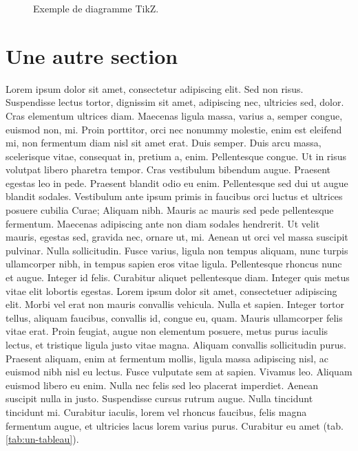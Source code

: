 \begin{figure}[htp]
  \centering
  
  \caption{Exemple de diagramme TikZ.}
  \label{fig:une-image}
\end{figure}

\section{Une autre section}
Lorem ipsum dolor sit amet, consectetur adipiscing elit. Sed non risus. Suspendisse lectus tortor, dignissim sit amet, adipiscing nec, ultricies sed, dolor. Cras elementum ultrices diam. Maecenas ligula massa, varius a, semper congue, euismod non, mi. Proin porttitor, orci nec nonummy molestie, enim est eleifend mi, non fermentum diam nisl sit amet erat. Duis semper. Duis arcu massa, scelerisque vitae, consequat in, pretium a, enim. Pellentesque congue. Ut in risus volutpat libero pharetra tempor. Cras vestibulum bibendum augue. Praesent egestas leo in pede. Praesent blandit odio eu enim. Pellentesque sed dui ut augue blandit sodales. Vestibulum ante ipsum primis in faucibus orci luctus et ultrices posuere cubilia Curae; Aliquam nibh. Mauris ac mauris sed pede pellentesque fermentum. Maecenas adipiscing ante non diam sodales hendrerit. Ut velit mauris, egestas sed, gravida nec, ornare ut, mi. Aenean ut orci vel massa suscipit pulvinar. Nulla sollicitudin. Fusce varius, ligula non tempus aliquam, nunc turpis ullamcorper nibh, in tempus sapien eros vitae ligula. Pellentesque rhoncus nunc et augue. Integer id felis. Curabitur aliquet pellentesque diam. Integer quis metus vitae elit lobortis egestas. Lorem ipsum dolor sit amet, consectetuer adipiscing elit. Morbi vel erat non mauris convallis vehicula. Nulla et sapien. Integer tortor tellus, aliquam faucibus, convallis id, congue eu, quam. Mauris ullamcorper felis vitae erat. Proin feugiat, augue non elementum posuere, metus purus iaculis lectus, et tristique ligula justo vitae magna. Aliquam convallis sollicitudin purus. Praesent aliquam, enim at fermentum mollis, ligula massa adipiscing nisl, ac euismod nibh nisl eu lectus. Fusce vulputate sem at sapien. Vivamus leo. Aliquam euismod libero eu enim. Nulla nec felis sed leo placerat imperdiet. Aenean suscipit nulla in justo. Suspendisse cursus rutrum augue. Nulla tincidunt tincidunt mi. Curabitur iaculis, lorem vel rhoncus faucibus, felis magna fermentum augue, et ultricies lacus lorem varius purus. Curabitur eu amet (tab. \ref{tab:un-tableau}).

